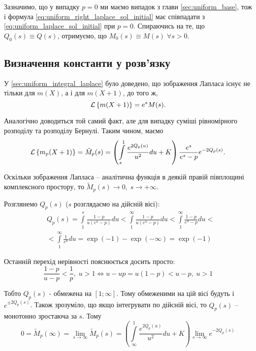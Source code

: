 Зазначимо, що у випадку $p=0$ ми маємо випадок з глави \ref{sec:uniform_base}, тож і формула \eqref{eq:uniform_right_laplace_sol_initial} має співпадати з \eqref{eq:uniform_laplace_sol_initial} при $p = 0$. Спираючись на те, що $Q_0(s) \equiv Q(s)$, отримуємо, що $M_0(s) \equiv M(s) \; \forall s > 0$.

\subsection{Визначення константи у розв'язку}

У \ref{sec:uniform_integral_laplace} було доведено, що зображення Лапласа існує не тільки для $m(X)$, а і для $m(X+1)$, до того ж,
\begin{equation}
	\mathcal{L}\left\{m(X+1)\right\} = e^s M(s).
\end{equation}

Аналогічно доводиться той самий факт, але для випадку суміші рівномірного розподілу та розподілу Бернулі. Таким чином, маємо
\begin{equation}
	\mathcal{L}\left\{m_p(X+1)\right\} =\tilde M_p(s)= \left( \int\limits_s^1 \frac{e^{2Q_p(u)}}{u^2} du + K \right) \frac{e^s}{e^s - p} e^{- 2Q_p(s)}.
\end{equation}

Оскільки зображення Лапласа – аналітична функція в деякій правій півплощині комплексного простору, то $\tilde M_p(s) \rightarrow 0,\; s \rightarrow +\infty$.

Розглянемо $Q_p(s)$ ($s$ розглядаємо на дійсній вісі):
\begin{equation}
\begin{split}
	\label{eq:q_alpha_s_major}
	&Q_p(s) = \int\limits_1^s \frac{1-p}{u(e^u - p)} du <  \int\limits_1^\infty \frac{1 - p}{u(e^u - p)} du < 
	\int\limits_1^\infty \frac{1- p}{e^u - p} du<\\
	&< \int\limits_1^\infty \frac{1}{e^u} du = \exp(-1) - \exp(-\infty) = \exp(-1)
\end{split}
\end{equation}

Останній перехід нерівності пояснюється досить просто:
$$
\frac{1-p}{u - p} < \frac{1}{p}, \; u > 1 \Leftrightarrow u - u p = u(1-p) < u - p, \; u > 1
$$

Тобто $Q_p(s)$ - обмежена на $[1; \infty]$. Тому обмеженими на цій вісі будуть і $e^{\pm 2Q_p(s)}$. Також зрозуміло, що якщо інтегрувати по дійсній вісі, то $Q_p(s)$ – монотонно зростаюча за $s$. Тому
\begin{equation}
	0 = \tilde M_p(\infty) = \lim_{s\rightarrow \infty} \tilde M_p(s) = \left( \int\limits_\infty^1 \frac{e^{2Q_p(u)}}{u^2} du + K \right) \lim_{s\rightarrow \infty} e^{- 2Q_p(s)}
\end{equation}


